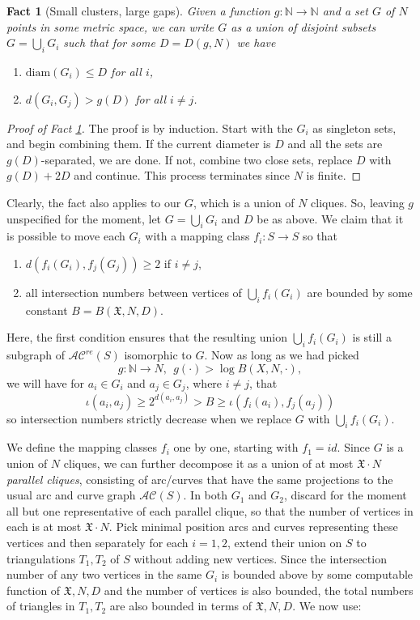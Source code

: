 \documentclass[11pt]{amsart}
\newtheorem{fact}[theorem]{Fact}
\theoremstyle{remark}
\numberwithin{equation}{section}
\newcommand{\N}{\mathbb{N}}
\newcommand{\cAC}{\mathcal{AC}}
\newcommand{\acre}{\cAC^{re}}
\begin{document}
 \begin{fact}[Small clusters, large gaps]
 Given a function $g : \N \longrightarrow \N$ and a set $G$ of $N$ points in some metric space, we can write $G$ as a union of disjoint subsets $G = \bigcup_i G_i$
  such that for some $D=D(g,N)$ we have
  \begin {enumerate}
  \item $\mathrm{diam}(G_i) \leq D$  for all $i$,
  \item	 $d(G_i,G_j) > g(D)$ for all $i\neq j$.
  \end {enumerate}\label{cluster}
 \end{fact} 
\begin{proof}[Proof of Fact \ref{cluster}]
 The proof is by induction. Start with the $G_i$ as singleton sets, and begin combining them. If the current diameter is $D$ and all the sets are $g(D)$-separated, we are done. If not, combine two close sets, replace $D$ with $g(D)+2D$ and continue. This process terminates since $N$ is finite.
\end{proof}

 Clearly, the fact also applies to our $G$, which is a union of $N$ cliques. So, leaving $g$ unspecified for the moment, let $G= \bigcup_i G_i$ and $D$ be as above.    We claim that it is possible to move each $G_i$ with a mapping class $f_i : S \longrightarrow S$ so that 
\begin {enumerate}
\item $d(f_i(G_i),f_j(G_j)) \geq 2$ if $i\neq j$,
\item all intersection numbers between vertices of $\bigcup_i f_i(G_i)$ are bounded by some constant $B=B(\mathfrak X,N,D).$
\end {enumerate}
 Here, the first condition ensures that the resulting union $\bigcup_i f_i(G_i)$ is still a subgraph of $\acre(S)$  isomorphic to $G$. Now as long as we had picked $$g : \N \longrightarrow N, \ \ g( \cdot ) > \log B(X,N,\cdot ),$$
 we will have for $a_i\in G_i$ and $a_j\in G_j$, where $i\neq j$, that $$\iota(a_i,a_j) \geq 2^{d(a_i,a_j)} > B \geq \iota(f_i(a_i),f_j(a_j))$$  so intersection numbers strictly decrease  when we replace $G$ with $\bigcup_i f_i(G_i)$.

 We define the mapping classes $f_i$ one by one, starting with $f_1 = id$. Since $G$ is a union of $N$ cliques, we can further decompose it as a union of at most $\mathfrak X \cdot N$ \emph {parallel cliques}, consisting of arc/curves that have the same projections to the usual arc and curve graph $\mathcal{AC}(S)$. In both $G_1$ and $G_2$, discard for the moment all but one representative of each parallel clique, so that the number of vertices in each is at most $\mathfrak X \cdot N$. Pick
minimal position arcs and curves representing these vertices and then separately for each $i=1,2$, extend their union on $S$ to triangulations $T_1,T_2$ of $S$ without adding new vertices.   Since the intersection number of any two  vertices in the same $G_i$ is bounded above by some computable function of $\mathfrak X,N,D$ and the number of vertices is also bounded, the total numbers of triangles in $T_1,T_2$ are also bounded in terms of $\mathfrak X,N,D$. We now use:
\end{document}
